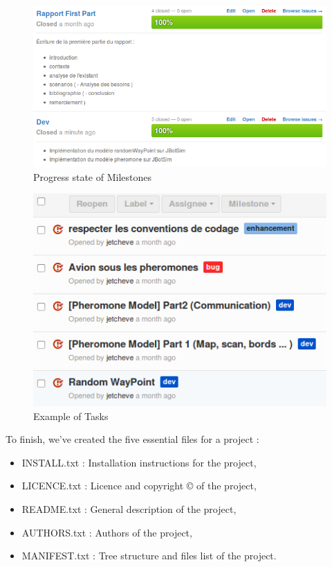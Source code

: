 \begin{figure}[!h]
   \includegraphics[scale=0.7]{../images/Milestones.png}
\caption{\label{Milestones}Progress state of Milestones}
\end{figure}

\begin{figure}[!h]
\center
   \includegraphics[scale=0.7]{../images/tasks.png}
\caption{\label{Tasks}Example of Tasks}
\end{figure}


To finish, we've created the five essential files for a project :

\begin{itemize}
\item INSTALL.txt  : Installation instructions for the project,
\item LICENCE.txt  : Licence and copyright \copyright{} of the project,
\item README.txt   : General description of the project,
\item AUTHORS.txt  : Authors of the project,
\item MANIFEST.txt : Tree structure and files list of the project.
\end{itemize}
